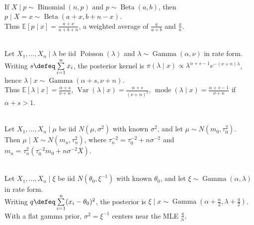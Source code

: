 \begin{example} \label{ex:beta-binomial-conjugacy} \\
If $X\mid p\sim\operatorname{Binomial}(n,p)$ and $p\sim\operatorname{Beta}(a,b)$, then $p\mid X=x\sim\operatorname{Beta}(a+x,b+n-x)$.\\
Thus $\mathbb{E}[p\mid x]=\frac{a+x}{a+b+n}$, a weighted average of $\frac{a}{a+b}$ and $\frac{x}{n}$.
\end{example}

\begin{example} \label{ex:gamma-poisson-conjugacy-rate} \\
Let $X_1,\ldots,X_n\mid\lambda$ be iid $\operatorname{Poisson}(\lambda)$ and $\lambda\sim\operatorname{Gamma}(\alpha,\nu)$ in rate form.\\
Writing $s\defeq\sum\limits_{i=1}^nx_i$, the posterior kernel is $\pi(\lambda\mid x)\propto\lambda^{\alpha+s-1}e^{-(\nu+n)\lambda}$, hence $\lambda\mid x\sim\operatorname{Gamma}(\alpha+s,\nu+n)$.\\
Thus $\mathbb{E}[\lambda\mid x]=\frac{\alpha+s}{\nu+n}$, $\operatorname{Var}(\lambda\mid x)=\frac{\alpha+s}{(\nu+n)^2}$, $\operatorname{mode}(\lambda\mid x)=\frac{\alpha+s-1}{\nu+n}$ if $\alpha+s>1$.
\end{example}

\begin{example} \label{ex:normal-normal-conjugacy} \\
Let $X_1,\ldots,X_n\mid\mu$ be iid $N(\mu,\sigma^2)$ with known $\sigma^2$, and let $\mu\sim N(m_0,\tau_0^2)$.\\
Then $\mu\mid X\sim N(m_n,\tau_n^2)$, where $\tau_n^{-2}=\tau_0^{-2}+n\sigma^{-2}$ and $m_n=\tau_n^2(\tau_0^{-2}m_0+n\sigma^{-2}\overline{X})$.
\end{example}

\begin{example} \label{ex:normal-precision-gamma-conjugacy} \\
Let $X_1,\ldots,X_n\mid\xi$ be iid $N(\theta_0,\xi^{-1})$ with known $\theta_0$, and let $\xi\sim\operatorname{Gamma}(\alpha,\lambda)$ in rate form.\\
Writing $q\defeq\sum\limits_{i=1}^n(x_i-\theta_0)^2$, the posterior is $\xi\mid x\sim\operatorname{Gamma}(\alpha+\frac{n}{2},\lambda+\frac{q}{2})$.\\
With a flat gamma prior, $\sigma^2=\xi^{-1}$ centers near the MLE $\frac{q}{n}$.
\end{example}

